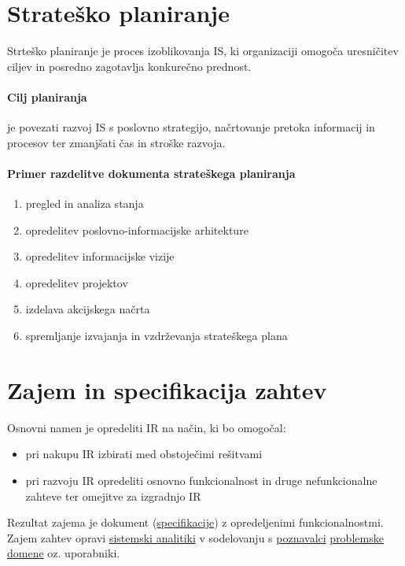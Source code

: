 \documentclass[a4paper,12pt]{report}
\begin{document}
   \pagebreak

   \section{Strateško planiranje}
   Strteško planiranje je proces izoblikovanja IS, ki organizaciji omogoča uresničitev ciljev in posredno zagotavlja konkurečno prednost.
   
   \paragraph{Cilj planiranja} je povezati razvoj IS s poslovno strategijo, načrtovanje pretoka informacij in procesov ter zmanjšati čas in stroške razvoja.

   \paragraph{Primer razdelitve dokumenta strateškega planiranja}\mbox{}
   \begin{enumerate}
      \item pregled in analiza stanja
      \item opredelitev poslovno-informacijske arhitekture
      \item opredelitev informacijske vizije
      \item opredelitev projektov
      \item izdelava akcijskega načrta
      \item spremljanje izvajanja in vzdrževanja strateškega plana
   \end{enumerate}

   \section{Zajem in specifikacija zahtev}
   Osnovni namen je opredeliti IR na način, ki bo omogočal:
   \begin{itemize}
      \item pri nakupu IR izbirati med obstoječimi rešitvami
      \item pri razvoju IR opredeliti osnovno funkcionalnost in druge nefunkcionalne zahteve ter omejitve za izgradnjo IR
   \end{itemize}

   Rezultat zajema je dokument (\underline{specifikacije}) z opredeljenimi funkcionalnostmi. Zajem zahtev opravi \underline{sistemski analitiki}
   v sodelovanju s \underline{poznavalci} \underline{problemske domene} oz. uporabniki.
\end{document}
